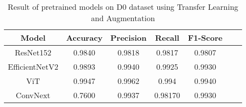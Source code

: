 \begin{table}[!htbp]
\centering
\begin{tabular}{|c|c|c|c|c|c|c|}
\hline
\textbf{Model} & \textbf{Accuracy} & \textbf{Precision} & \textbf{Recall} & \textbf{F1-Score}\\
\hline
ResNet152 & 0.9840 & 0.9818 & 0.9817 & 0.9807\\
\hline
EfficientNetV2 & 0.9893 & 0.9940 & 0.9925 & 0.9930\\
\hline
ViT & 0.9947 & 0.9962 & 0.994 & 0.9940\\
\hline
ConvNext & 0.7600 & 0.9937 & 0.98170 & 0.9930\\
\hline
\end{tabular}
\caption{Result of pretrained models on D0 dataset using Transfer Learning and Augmentation}
\end{table}

